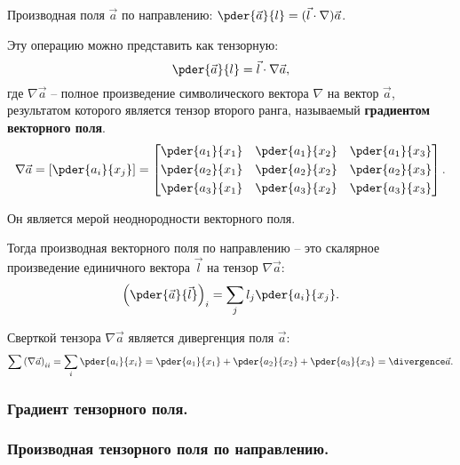 	Производная поля \( \vec{a} \) по направлению: \( \pder{\vec{a}}{l} = (\vec{l}\cdot\nabla)\vec{a} \).
	
	Эту операцию можно представить как тензорную:
	\[ \pder{\vec{a}}{l} = \vec{l}\cdot\nabla\vec{a}, \]
	где \( \nabla\vec{a} \) -- полное произведение символического вектора \( \nabla \) на вектор \( \vec{a} \), результатом которого является тензор второго ранга, называемый \textbf{градиентом векторного поля}.
	\[ \nabla\vec{a} = \left[\pder{a_i}{x_j}\right] =
	\begin{bmatrix}
	\pder{a_1}{x_1} & \pder{a_1}{x_2} & \pder{a_1}{x_3} \\[0.3em]
	\pder{a_2}{x_1} & \pder{a_2}{x_2} & \pder{a_2}{x_3} \\[0.3em]
	\pder{a_3}{x_1} & \pder{a_3}{x_2} & \pder{a_3}{x_3}
	\end{bmatrix}. \]
	
	Он является мерой неоднородности векторного поля.
	
	Тогда производная векторного поля по направлению -- это скалярное произведение единичного вектора \( \vec{l} \) на тензор \( \nabla\vec{a} \):
	\[ \left(\pder{\vec{a}}{\vec{l}}\right)_i = \sum\limits_j l_j \pder{a_i}{x_j}. \]
	
	\begin{remark}
	Сверткой тензора \( \nabla\vec{a} \) является дивергенция поля \( \vec{a} \):
	\[ \sum\left(\nabla\vec{a}\right)_{ii} = \sum\limits_i \pder{a_i}{x_i} = \pder{a_1}{x_1} +  \pder{a_2}{x_2} + \pder{a_3}{x_3} = \divergence\vec{a}. \]
	\end{remark}

\subsubsection{Градиент тензорного поля.}

\subsubsection{Производная тензорного поля по направлению.}

	
